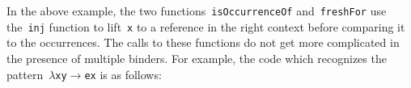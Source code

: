 \documentclass[9pt,authoryear]{sigplanconf}
\begin{document}
%
In the above example, the two functions{~}\texttt{isOccurrenceOf}    and{~}\texttt{freshFor} use the{~}\texttt{inj} function to lift{~}\texttt{x} to
    a reference in the right context before comparing it to the
    occurrences. The calls to these functions do not get more
    complicated in the presence of multiple binders. For example, the
    code which recognizes the pattern{~}\texttt{$ \lambda $}\texttt{\mbox{\hspace{0.50em}}}\texttt{x}\texttt{\mbox{\hspace{0.50em}}}\texttt{y}\texttt{\mbox{\hspace{0.50em}}}\texttt{$ \rightarrow $}\texttt{\mbox{\hspace{0.50em}}}\texttt{e}\texttt{\mbox{\hspace{0.50em}}}\texttt{x} is as follows{:}%


{\nopagebreak }
\end{document}
